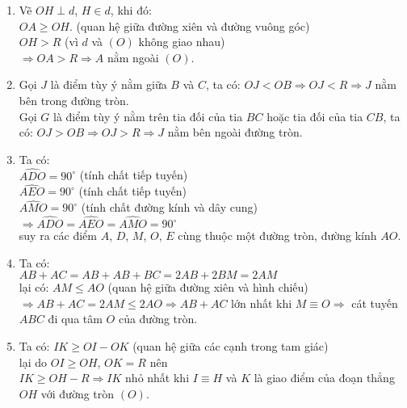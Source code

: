 \begin{bt}
{\begin{center}
		\end{center}
		\begin{enumerate}
			\item Vẽ $OH \perp d$, $H \in d$, khi đó:\\
			$OA \ge OH$. (quan hệ giữa đường xiên và đường vuông góc)\\
			$OH>R$ (vì $d$ và $(O)$ không giao nhau)\\
			$\Rightarrow OA>R \Rightarrow A$ nằm ngoài $(O)$.
			\item Gọi $J$ là điểm tùy ý nằm giữa $B$ và $C$, ta có: $OJ<OB \Rightarrow OJ<R \Rightarrow J$ nằm bên trong đường tròn.\\
			Gọi $G$ là điểm tùy ý nằm trên tia đối của tia $BC$ hoặc tia đối của tia $CB$, ta có: $OJ>OB \Rightarrow OJ>R \Rightarrow J$ nằm bên ngoài đường tròn.
			\item Ta có:\\
			$\widehat{ADO}=90^\circ$ (tính chất tiếp tuyến)\\
			$\widehat{AEO}=90^\circ$ (tính chất tiếp tuyến)\\
			$\widehat{AMO}=90^\circ$ (tính chất đường kính và dây cung)\\
			$\Rightarrow \widehat{ADO}=\widehat{AEO}=\widehat{AMO}=90^\circ$\\
			suy ra các điểm $A$, $D$, $M$, $O$, $E$ cùng thuộc một đường tròn, đường kính $AO$.
			\item Ta có:\\
			$AB+AC=AB+AB+BC=2AB+2BM=2AM$\\
			lại có: $AM \le AO$ (quan hệ giữa đường xiên và hình chiếu)\\
			$\Rightarrow AB+AC=2AM \le 2AO \Rightarrow AB+AC$ lớn nhất khi $M \equiv O \Rightarrow$ cát tuyến $ABC$ đi qua tâm $O$ của đường tròn.
			\item Ta có: $IK \ge OI-OK$ (quan hệ giữa các cạnh trong tam giác)\\
			lại do $OI \ge OH$, $OK=R$ nên\\
			$IK \ge OH-R \Rightarrow IK$ nhỏ nhất khi $I \equiv H$ và $K$ là giao điểm của đoạn thẳng $OH$ với đường tròn $(O)$.
		\end{enumerate}
	}
\end{bt}

